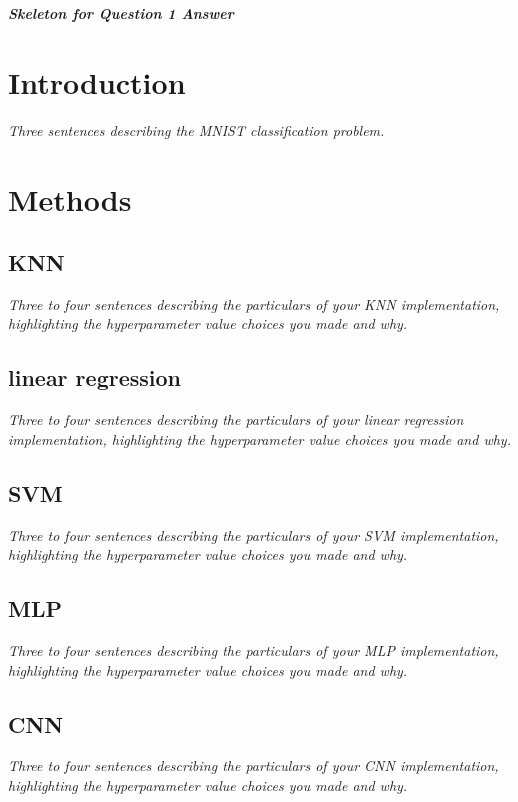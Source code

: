 \documentclass{article}
\begin{document}
{\small


}
\newpage



%
%
{\em \bf Skeleton for Question 1 Answer}

\section{Introduction}

\emph{Three sentences describing the MNIST classification problem.}
\section{Methods}
\subsection{KNN}
\emph{Three to four sentences describing the particulars of your KNN implementation, highlighting the hyperparameter value choices you made and why.}
\subsection{linear regression}
\emph{Three to four sentences describing the particulars of your linear regression implementation, highlighting the hyperparameter value choices you made and why.}
\subsection{SVM}
\emph{Three to four sentences describing the particulars of your SVM implementation, highlighting the hyperparameter value choices you made and why.}
\subsection{MLP}
\emph{Three to four sentences describing the particulars of your MLP implementation, highlighting the hyperparameter value choices you made and why.}
\subsection{CNN}
\emph{Three to four sentences describing the particulars of your CNN implementation, highlighting the hyperparameter value choices you made and why.}
\end{document}

